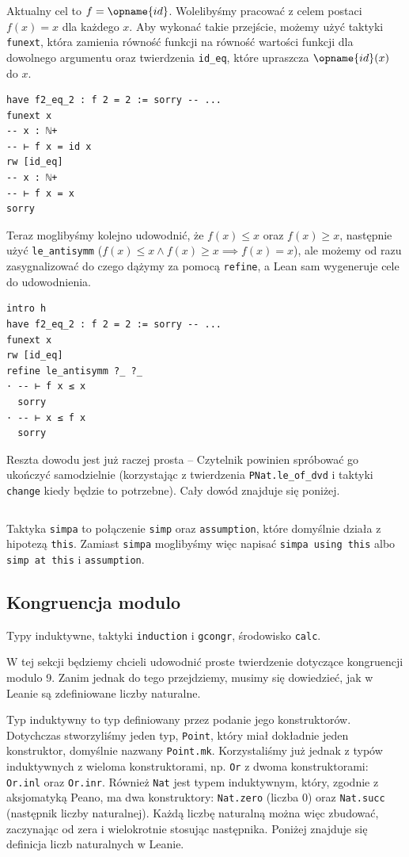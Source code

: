 \documentclass[polish,pretty,bibliography=totocnumbered]{angav}
\newcommand{\Lean}[1]{\texttt{#1}}
\begin{document}
Aktualny cel to $f = \opname{id}$. Wolelibyśmy pracować z celem postaci $f(x) = x$ dla każdego $x$. Aby wykonać takie przejście, możemy użyć taktyki \Lean{funext}, która zamienia równość funkcji na równość wartości funkcji dla dowolnego argumentu oraz twierdzenia \Lean{id_eq}, które upraszcza $\opname{id}(x)$ do $x$.
\begin{verbatim}
have f2_eq_2 : f 2 = 2 := sorry -- ...
funext x
-- x : ℕ+
-- ⊢ f x = id x
rw [id_eq]
-- x : ℕ+
-- ⊢ f x = x
sorry
\end{verbatim}

Teraz moglibyśmy kolejno udowodnić, że $f(x) \leq x$ oraz $f(x) \geq x$, następnie użyć \Lean{le_antisymm} ($f(x) \leq x \land f(x) \geq x \implies f(x) = x$), ale możemy od razu zasygnalizować do czego dążymy za pomocą \Lean{refine}, a Lean sam wygeneruje cele do udowodnienia.
\begin{verbatim}
intro h
have f2_eq_2 : f 2 = 2 := sorry -- ...
funext x
rw [id_eq]
refine le_antisymm ?_ ?_
· -- ⊢ f x ≤ x
  sorry
· -- ⊢ x ≤ f x
  sorry
\end{verbatim}

Reszta dowodu jest już raczej prosta -- Czytelnik powinien spróbować go ukończyć samodzielnie (korzystając z twierdzenia \Lean{PNat.le_of_dvd} i taktyki \Lean{change} kiedy będzie to potrzebne). Cały dowód znajduje się poniżej.
\inputminted{lean4}{case_studies/FunctionalEquation.lean}
Taktyka \Lean{simpa} to połączenie \Lean{simp} oraz \Lean{assumption}, które domyślnie działa z hipotezą \Lean{this}. Zamiast \Lean{simpa} moglibyśmy więc napisać \Lean{simpa using this} albo \Lean{simp at this} i \Lean{assumption}.

\subsection{Kongruencja modulo}

\begin{lesson-goals}
    Typy induktywne, taktyki \Lean{induction} i \Lean{gcongr}, środowisko \Lean{calc}.
\end{lesson-goals}

W tej sekcji będziemy chcieli udowodnić proste twierdzenie dotyczące kongruencji modulo 9. Zanim jednak do tego przejdziemy, musimy się dowiedzieć, jak w Leanie są zdefiniowane liczby naturalne.

Typ induktywny to typ definiowany przez podanie jego konstruktorów. Dotychczas stworzyliśmy jeden typ, \Lean{Point}, który miał dokładnie jeden konstruktor, domyślnie nazwany \Lean{Point.mk}.
Korzystaliśmy już jednak z typów induktywnych z wieloma konstruktorami, np. \Lean{Or} z dwoma konstruktorami: \Lean{Or.inl} oraz \Lean{Or.inr}.
Również \Lean{Nat} jest typem induktywnym, który, zgodnie z aksjomatyką Peano, ma dwa konstruktory: \Lean{Nat.zero} (liczba $0$) oraz \Lean{Nat.succ} (następnik liczby naturalnej). Każdą liczbę naturalną można więc zbudować, zaczynając od zera i wielokrotnie stosując następnika. Poniżej znajduje się definicja liczb naturalnych w Leanie.
\end{document}
